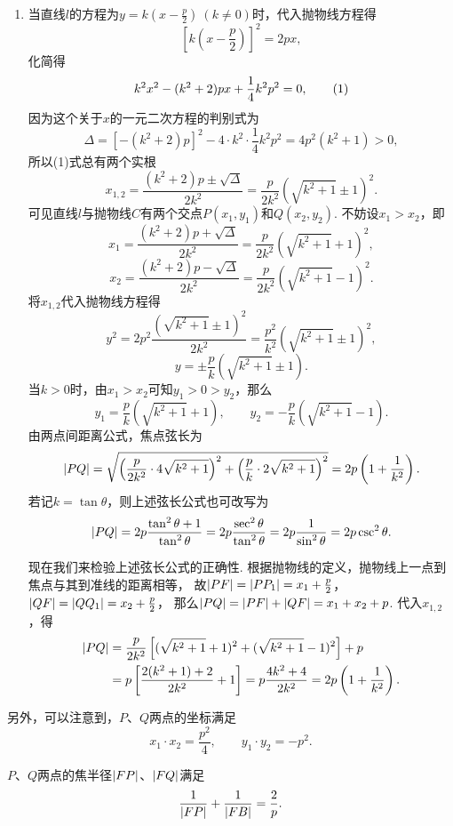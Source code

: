 \begin{example}
\begin{enumerate}
	\item 当直线\(l\)的方程为\(y=k\left(x-\frac{p}{2}\right)\ (k\neq0)\)时，代入抛物线方程得\[
		\left[k \left(x-\frac{p}{2}\right)\right]^2 = 2px,
	\]
	化简得\begin{gather}
		k^2 x^2 - (k^2 + 2)px + \frac{1}{4} k^2 p^2 = 0, \tag1
	\end{gather}
	因为这个关于\(x\)的一元二次方程的判别式为\[
		\Delta = [- (k^2 + 2)p]^2 - 4 \cdot k^2 \cdot \frac{1}{4} k^2 p^2
		= 4 p^2 (k^2 + 1) > 0,
	\]
	所以(1)式总有两个实根\[
		x_{1,2} = \frac{(k^2+2)p \pm \sqrt\Delta}{2 k^2}
		= \frac{p}{2 k^2} (\sqrt{k^2+1} \pm 1)^2.
	\]
	可见直线\(l\)与抛物线\(C\)有两个交点\(P(x_1,y_1)\)和\(Q(x_2,y_2)\).
	不妨设\(x_1 > x_2\)，即\[
		x_1 = \frac{(k^2+2)p + \sqrt\Delta}{2 k^2}
		= \frac{p}{2 k^2} (\sqrt{k^2+1} + 1)^2,
	\]\[
		x_2 = \frac{(k^2+2)p - \sqrt\Delta}{2 k^2}
		= \frac{p}{2 k^2} (\sqrt{k^2+1} - 1)^2.
	\]
	将\(x_{1,2}\)代入抛物线方程得\[
		y^2 = 2 p^2 \frac{(\sqrt{k^2+1}\pm1)^2}{2 k^2}
		= \frac{p^2}{k^2} (\sqrt{k^2+1}\pm1)^2,
	\]\[
		y = \pm \frac{p}{k} (\sqrt{k^2+1}\pm1).
	\]
	当\(k>0\)时，由\(x_1 > x_2\)可知\(y_1 > 0 > y_2\)，那么\[
		y_1 = \frac{p}{k} (\sqrt{k^2+1}+1),
		\qquad
		y_2 = -\frac{p}{k} (\sqrt{k^2+1}-1).
	\]
	由两点间距离公式，焦点弦长为\begin{equation}
		\abs{PQ} = \sqrt{
		\left(\frac{p}{2 k^2} \cdot 4 \sqrt{k^2+1}\right)^2
		+\left(\frac{p}{k} \cdot 2 \sqrt{k^2+1}\right)^2
		} = 2p \left(1+\frac{1}{k^2}\right).
	\end{equation}
	若记\(k=\tan\theta\)，则上述弦长公式也可改写为\begin{equation}
		\abs{PQ} = 2p \frac{\tan^2\theta+1}{\tan^2\theta}
		= 2p \frac{\sec^2\theta}{\tan^2\theta}
		= 2p \frac{1}{\sin^2\theta}
		= 2p \csc^2\theta.
	\end{equation}

	现在我们来检验上述弦长公式的正确性.
	根据抛物线的定义，抛物线上一点到焦点与其到准线的距离相等，
	故\(\abs{PF} = \abs{P P_1} = x_1 + \frac{p}{2}\)，
	\(\abs{QF} = \abs{Q Q_1} = x_2 + \frac{p}{2}\)，
	那么\(\abs{PQ} = \abs{PF}+\abs{QF} = x_1 + x_2 + p\).
	代入\(x_{1,2}\)，得\begin{align*}
		\abs{PQ} &= \frac{p}{2 k^2} \left[(\sqrt{k^2+1} + 1)^2 + (\sqrt{k^2+1} - 1)^2\right] + p \\
		&= p\left[\frac{2(k^2 + 1) + 2}{2 k^2} + 1\right]
		= p \frac{4k^2 + 4}{2k^2}
		= 2p \left(1+\frac{1}{k^2}\right).
	\end{align*}
\end{enumerate}

另外，可以注意到，\(P\)、\(Q\)两点的坐标满足\begin{equation}
	x_1 \cdot x_2 = \frac{p^2}{4},
	\qquad
	y_1 \cdot y_2 = -p^2.
\end{equation}

\(P\)、\(Q\)两点的焦半径\(\abs{FP}\)、\(\abs{FQ}\)满足\begin{equation}
	\frac{1}{\abs{FP}} + \frac{1}{\abs{FB}}
	= \frac{2}{p}.
\end{equation}
\end{example}


